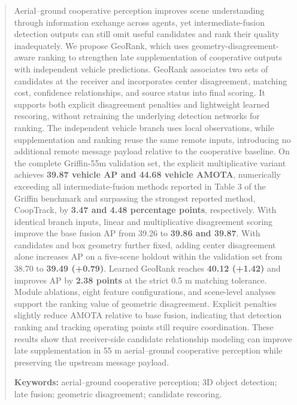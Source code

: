 \begin{abstract}
Aerial--ground cooperative perception improves scene understanding through information exchange across agents, yet intermediate-fusion detection outputs can still omit useful candidates and rank their quality inadequately. We propose GeoRank, which uses geometry-disagreement-aware ranking to strengthen late supplementation of cooperative outputs with independent vehicle predictions. GeoRank associates two sets of candidates at the receiver and incorporates center disagreement, matching cost, confidence relationships, and source status into final scoring. It supports both explicit disagreement penalties and lightweight learned rescoring, without retraining the underlying detection networks for ranking. The independent vehicle branch uses local observations, while supplementation and ranking reuse the same remote inputs, introducing no additional remote message payload relative to the cooperative baseline. On the complete Griffin-55m validation set, the explicit multiplicative variant achieves \textbf{39.87 vehicle AP and 44.68 vehicle AMOTA}, numerically exceeding all intermediate-fusion methods reported in Table 3 of the Griffin benchmark and surpassing the strongest reported method, CoopTrack, by \textbf{3.47 and 4.48 percentage points}, respectively. With identical branch inputs, linear and multiplicative disagreement scoring improve the base fusion AP from 39.26 to \textbf{39.86 and 39.87}. With candidates and box geometry further fixed, adding center disagreement alone increases AP on a five-scene holdout within the validation set from 38.70 to \textbf{39.49 (+0.79)}. Learned GeoRank reaches \textbf{40.12 (+1.42)} and improves AP by \textbf{2.38 points} at the strict 0.5 m matching tolerance. Module ablations, eight feature configurations, and scene-level analyses support the ranking value of geometric disagreement. Explicit penalties slightly reduce AMOTA relative to base fusion, indicating that detection ranking and tracking operating points still require coordination. These results show that receiver-side candidate relationship modeling can improve late supplementation in 55 m aerial--ground cooperative perception while preserving the upstream message payload.

\textbf{Keywords:} aerial--ground cooperative perception; 3D object detection; late fusion; geometric disagreement; candidate rescoring.
\end{abstract}
